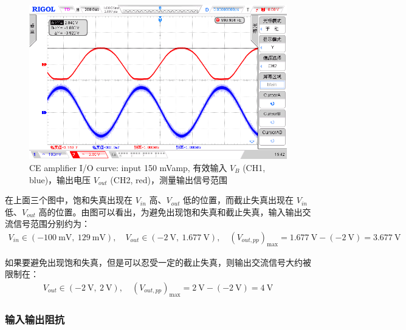 \documentclass[UTF8]{article}
\begin{document}
\begin{figure}[H]\centering
    \includegraphics[width=\columnwidth]{LCE-02-三极管/assets/CE 截止与饱和失真 (错位) - Vout 范围, input 150 mVamp.png}
    \caption{CE amplifier I/O curve: input 150 mVamp, 有效输入 $V_{B}$ (CH1, blue)，输出电压 $V_{out}$ (CH2, red)，测量输出信号范围}
\end{figure}

在上面三个图中，饱和失真出现在 $V_{in}$ 高、$V_{out}$ 低的位置，而截止失真出现在 $V_{in}$ 低、$V_{out}$ 高的位置。由图可以看出，为避免出现饱和失真和截止失真，输入输出交流信号范围分别约为：
\begin{gather}
V_{in} \in (-100 \ \mathrm{mV},\ 129 \ \mathrm{mV}),\quad 
V_{out} \in (-2 \ \mathrm{V},\ 1.677 \ \mathrm{V}),\quad 
(V_{out,pp})_{\max} = 1.677 \ \mathrm{V} - (-2 \ \mathrm{V}) = 3.677 \ \mathrm{V}
\end{gather}

\noindent 如果要避免出现饱和失真，但是可以忍受一定的截止失真，则输出交流信号大约被限制在：
\begin{gather}
V_{out} \in (-2 \ \mathrm{V},\ 2 \ \mathrm{V}),\quad 
(V_{out,pp})_{\max} = 2 \ \mathrm{V} - (-2 \ \mathrm{V}) = 4 \ \mathrm{V}
\end{gather}



\subsubsection{输入输出阻抗}
\end{document}
